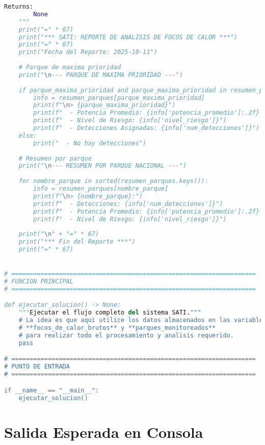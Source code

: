 \documentclass[11pt,a4paper]{article}
\begin{document}
\begin{lstlisting}[language=Python]
    Returns:
        None
    """
    print("=" * 67)
    print("*** SATI: REPORTE DE ANALISIS DE FOCOS DE CALOR ***")
    print("=" * 67)
    print("Fecha del Reporte: 2025-10-11")
    
    # Parque de maxima prioridad
    print("\n--- PARQUE DE MAXIMA PRIORIDAD ---")
    
    if parque_maxima_prioridad and parque_maxima_prioridad in resumen_parques:
        info = resumen_parques[parque_maxima_prioridad]
        print(f"\n> {parque_maxima_prioridad}")
        print(f"  - Potencia Promedio: {info['potencia_promedio']:.2f} MW")
        print(f"  - Nivel de Riesgo: {info['nivel_riesgo']}")
        print(f"  - Detecciones Asignadas: {info['num_detecciones']}")
    else:
        print("  - No hay detecciones")
    
    # Resumen por parque
    print("\n--- RESUMEN POR PARQUE NACIONAL ---")
    
    for nombre_parque in sorted(resumen_parques.keys()):
        info = resumen_parques[nombre_parque]
        print(f"\n> {nombre_parque}:")
        print(f"  - Detecciones: {info['num_detecciones']}")
        print(f"  - Potencia Promedio: {info['potencia_promedio']:.2f} MW")
        print(f"  - Nivel de Riesgo: {info['nivel_riesgo']}")
    
    print("\n" + "=" * 67)
    print("*** Fin del Reporte ***")
    print("=" * 67)


# ===================================================================
# FUNCION PRINCIPAL
# ===================================================================

def ejecutar_solucion() -> None:
    """Ejecutar el flujo completo del sistema SATI."""
    # La idea es que aqui utilice los datos almacenados en las variables
    # **focos_de_calor_brutos** y **parques_monitoreados**
    # para realizar todo el procesamiento y analisis requerido.
    pass

# ===================================================================
# PUNTO DE ENTRADA
# ===================================================================

if __name__ == "__main__":
    ejecutar_solucion()
\end{lstlisting}

\newpage

\section{Salida Esperada en Consola}
\end{document}
